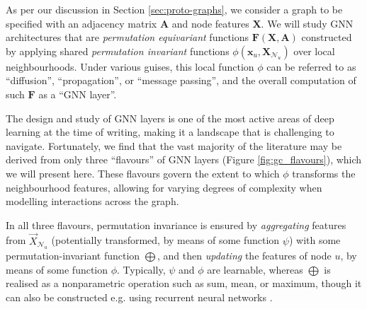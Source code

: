 As per our discussion in Section \ref{sec:proto-graphs}, we consider a graph to be specified with an adjacency matrix $\mathbf{A}$ and node features $\mathbf{X}$. 
%
%
We will study GNN architectures that are {\em permutation equivariant} functions $\mathbf{F}(\mathbf{X},\mathbf{A})$ constructed by applying shared {\em permutation invariant} functions $\phi(\mathbf{x}_u, \mathbf{X}_{\mathcal{N}_u})$ over local neighbourhoods. Under various guises, this local function $\phi$ can be referred to as ``diffusion'', ``propagation'', or ``message passing'', and the overall computation of such $\mathbf{F}$ as a ``GNN layer''. 


The design and study of GNN layers is one of the most active areas of deep learning at the time of writing, making it a landscape that is challenging to navigate. Fortunately, we find that the vast majority of the literature may be derived from only three ``flavours'' of GNN layers (Figure \ref{fig:gc_flavours}), which we will present here. These flavours govern the extent to which $\phi$ transforms the neighbourhood features, allowing for varying degrees of complexity when modelling interactions across the graph.


In all three flavours, permutation invariance is ensured by \emph{aggregating} features from $\vec{X}_{\mathcal{N}_u}$ (potentially transformed, by means of some function $\psi$) with some permutation-invariant function $\bigoplus$, and then {\em updating} the features of node $u$, by means of some function $\phi$. Typically, $\psi$ and $\phi$ are learnable,
%
whereas $\bigoplus$ is realised as a nonparametric operation such as sum, mean, or maximum, though it can also be constructed e.g. using recurrent neural networks \citep{murphy2018janossy}. 


